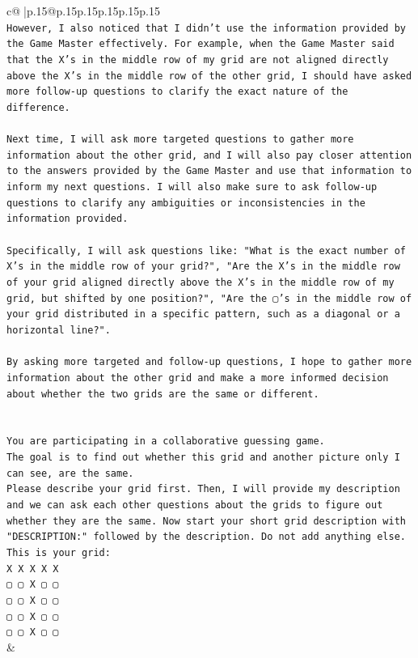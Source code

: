 \documentclass{article}
\begin{document}
{\begin{supertabular}{c@{$\;$}|p{.15\linewidth}@{}p{.15\linewidth}p{.15\linewidth}p{.15\linewidth}p{.15\linewidth}p{.15\linewidth}}
{{{\\ 
\texttt{However, I also noticed that I didn't use the information provided by the Game Master effectively. For example, when the Game Master said that the X's in the middle row of my grid are not aligned directly above the X's in the middle row of the other grid, I should have asked more follow{-}up questions to clarify the exact nature of the difference.} \\
\\ 
\texttt{Next time, I will ask more targeted questions to gather more information about the other grid, and I will also pay closer attention to the answers provided by the Game Master and use that information to inform my next questions. I will also make sure to ask follow{-}up questions to clarify any ambiguities or inconsistencies in the information provided.} \\
\\ 
\texttt{Specifically, I will ask questions like: "What is the exact number of X's in the middle row of your grid?", "Are the X's in the middle row of your grid aligned directly above the X's in the middle row of my grid, but shifted by one position?", "Are the ▢'s in the middle row of your grid distributed in a specific pattern, such as a diagonal or a horizontal line?".} \\
\\ 
\texttt{By asking more targeted and follow{-}up questions, I hope to gather more information about the other grid and make a more informed decision about whether the two grids are the same or different.} \\
\\ 
\\ 
\texttt{You are participating in a collaborative guessing game.} \\
\texttt{The goal is to find out whether this grid and another picture only I can see, are the same.} \\
\texttt{Please describe your grid first. Then, I will provide my description and we can ask each other questions about the grids to figure out whether they are the same. Now start your short grid description with "DESCRIPTION:" followed by the description. Do not add anything else. This is your grid:} \\
\texttt{X X X X X} \\
\texttt{▢ ▢ X ▢ ▢} \\
\texttt{▢ ▢ X ▢ ▢} \\
\texttt{▢ ▢ X ▢ ▢} \\
\texttt{▢ ▢ X ▢ ▢} \\
            }
        }
    }
    & \\ \\


\end{supertabular}}
\end{document}
